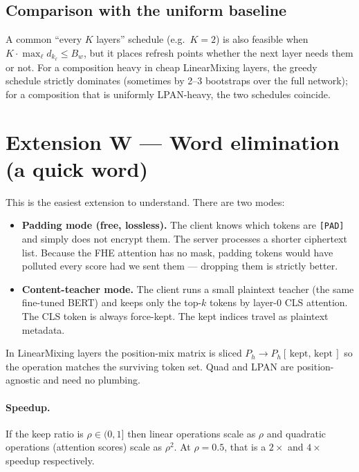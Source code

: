 \documentclass[11pt,a4paper]{article}
\begin{document}
\subsection{Comparison with the uniform baseline}
A common ``every $K$ layers'' schedule (e.g.\ $K=2$) is also feasible
when $K \cdot \max_\ell d_{k_\ell} \le B_w$, but it places refresh
points whether the next layer needs them or not. For a composition
heavy in cheap LinearMixing layers, the greedy schedule strictly
dominates (sometimes by 2--3 bootstraps over the full network); for
a composition that is uniformly LPAN-heavy, the two schedules
coincide.

\section{Extension W --- Word elimination (a quick word)}

This is the easiest extension to understand. There are two modes:

\begin{itemize}
    \item \textbf{Padding mode (free, lossless).} The client knows
    which tokens are \texttt{[PAD]} and simply does not encrypt them.
    The server processes a shorter ciphertext list. Because the FHE
    attention has no mask, padding tokens would have polluted every
    score had we sent them — dropping them is strictly better.
    \item \textbf{Content-teacher mode.} The client runs a small
    plaintext teacher (the same fine-tuned BERT) and keeps only the
    top-$k$ tokens by layer-0 CLS attention. The CLS token is always
    force-kept. The kept indices travel as plaintext metadata.
\end{itemize}

In LinearMixing layers the position-mix matrix is sliced
$P_h \to P_h[\,\text{kept},\,\text{kept}\,]$ so the operation matches
the surviving token set. Quad and LPAN are position-agnostic and
need no plumbing.

\paragraph{Speedup.} If the keep ratio is $\rho \in (0,1]$ then linear
operations scale as $\rho$ and quadratic operations (attention scores)
scale as $\rho^2$. At $\rho = 0.5$, that is a $2\times$ and $4\times$
speedup respectively.
\end{document}
